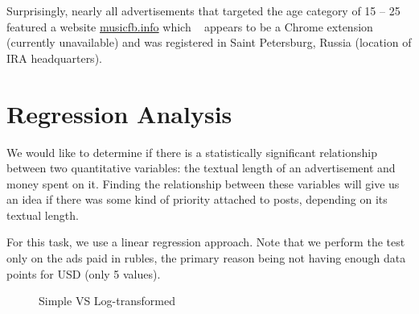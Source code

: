 \documentclass[12pt]{article}
\theoremstyle{definition}
\begin{document}
Surprisingly, nearly all advertisements that targeted the age category of
15 -- 25 featured a website \url{musicfb.info} which ~\cite{musicfb-info}
appears to be a Chrome extension (currently unavailable) and was registered in
Saint Petersburg, Russia (location of IRA headquarters).


\section*{\centering Regression Analysis}

We would like to determine if there is a statistically significant relationship
between two quantitative variables: the textual length of an advertisement and
money spent on it. Finding the relationship between these variables will give
us an idea if there was some kind of priority attached to posts, depending on
its textual length.

\bigskip

For this task, we use a linear regression approach. Note that we perform the
test only on the ads paid in rubles, the primary reason being not having enough
data points for USD (only 5 values).

\begin{figure}[H]
  \centering
  \hfill
  \caption{Simple VS Log-transformed}
  \label{fig:example}
\end{figure}
\end{document}
